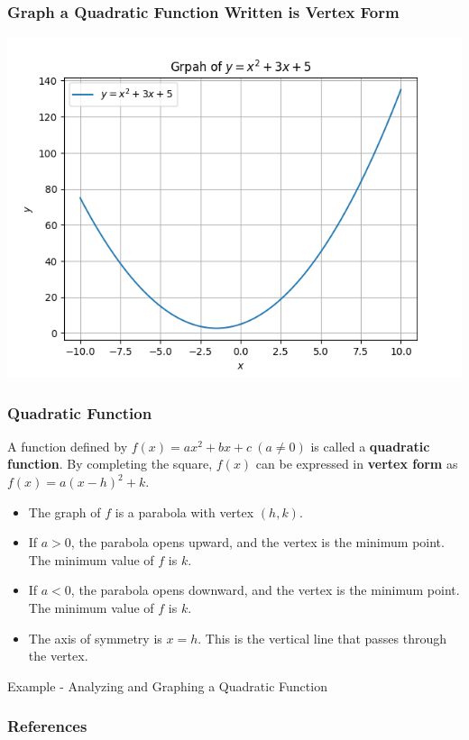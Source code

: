 \documentclass{beamer}
\begin{document}
\begin{frame}
    \frametitle{Graph a Quadratic Function Written is Vertex Form}
    \includegraphics[scale=0.5]{figs/Figure_3.png}
\end{frame}

\begin{frame}
    \frametitle{Quadratic Function}

    A function defined by \(f(x) = ax^2 +bx +c~ (a \ne 0)\) is called a \textbf{quadratic function}. By completing the square, \(f(x)\) can be expressed in \textbf{vertex form} as \(f(x)= a(x-h)^2+k\).\pause
    \begin{itemize}
        \item The graph of \(f\) is a parabola with vertex \((h,k)\). \pause
        \item If \(a>0\), the parabola opens upward, and the vertex is the minimum point. The minimum value of \(f\) is \(k\). \pause
        \item If \(a<0\), the parabola opens downward, and the vertex is the minimum point. The minimum value of \(f\) is \(k\). \pause
        \item The axis of symmetry is \(x=h\). This is the vertical line that passes through the vertex. 
    \end{itemize}

\end{frame}

\begin{frame}{Example - Analyzing and Graphing a Quadratic Function}

    
    
\end{frame}





\begin{frame}
    \frametitle{References}
\end{frame}
\end{document}
